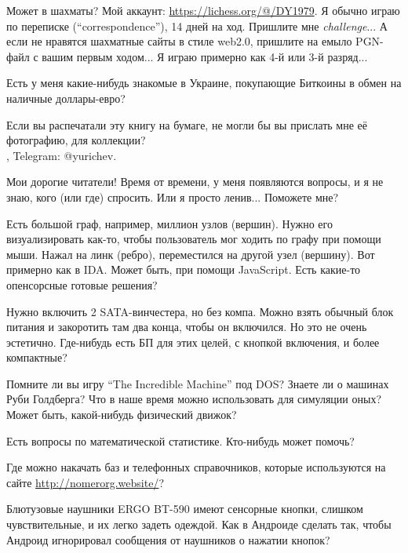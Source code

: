 \myhrule{}

Может в шахматы?
Мой аккаунт: \url{https://lichess.org/@/DY1979}.
Я обычно играю по переписке (``correspondence''), 14 дней на ход.
Пришлите мне \textit{challenge}...
А если не нравятся шахматные сайты в стиле web2.0, пришлите на емыло PGN-файл с вашим первым ходом...
Я играю примерно как 4-й или 3-й разряд...

\myhrule{}

Есть у меня какие-нибудь знакомые в Украине, покупающие Биткоины в обмен на наличные доллары-евро?

\myhrule{}

Если вы распечатали эту книгу на бумаге, не могли бы вы прислать мне её фотографию, для коллекции?\\
\EMAIL{}, Telegram: @yurichev.

\myhrule{}

Мои дорогие читатели! Время от времени, у меня появляются вопросы, и я не знаю, кого (или где) спросить.
Или я просто ленив...
Поможете мне?

\myhrule{}

Есть большой граф, например, миллион узлов (вершин).
Нужно его визуализировать как-то, чтобы пользователь мог ходить по графу при помощи мыши.
Нажал на линк (ребро), переместился на другой узел (вершину).
Вот примерно как в IDA.
Может быть, при помощи JavaScript.
Есть какие-то опенсорсные готовые решения?

\myhrule{}

Нужно включить 2 SATA-винчестера, но без компа.
Можно взять обычный блок питания и закоротить там два конца, чтобы он включился.
Но это не очень эстетично.
Где-нибудь есть БП для этих целей, с кнопкой включения, и более компактные?

\myhrule{}

Помните ли вы игру ``The Incredible Machine'' под DOS?
Знаете ли о машинах Руби Голдберга?
Что в наше время можно использовать для симуляции оных?
Может быть, какой-нибудь физический движок?

\myhrule{}

Есть вопросы по математической статистике. Кто-нибудь может помочь?

\myhrule{}

Где можно накачать баз и телефонных справочников, которые используются на сайте \url{http://nomerorg.website/}?

\myhrule{}

Блютузовые наушники ERGO BT-590 имеют сенсорные кнопки, слишком чувствительные, и их легко задеть одеждой.
Как в Андроиде сделать так, чтобы Андроид игнорировал сообщения от наушников о нажатии кнопок?

